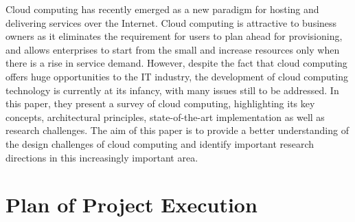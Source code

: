 \documentclass[oneside,a4paper,12pt]{report}
\begin{document}
\begin{enumerate}
Cloud computing has recently emerged as a new paradigm for hosting and delivering services over the Internet. Cloud computing is attractive to business owners as it eliminates the requirement for users to plan ahead for provisioning, and allows enterprises to start from the small and increase resources only when there is a rise in service demand. However, despite the fact that cloud computing offers huge opportunities to the IT industry, the development of cloud computing technology is currently at its infancy, with many issues still to be addressed. In this paper, they present a survey of cloud computing, highlighting its key concepts, architectural principles, state-of-the-art implementation as well as research challenges. The aim of this paper is to provide a better understanding of the design challenges of cloud computing and identify important research directions in this increasingly important area.\\
\end{enumerate}   

\section{Plan of Project Execution}
\end{document}

